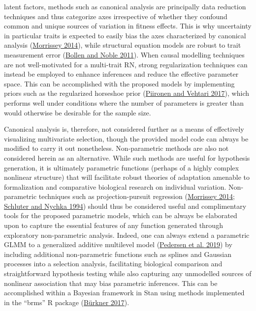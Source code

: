\documentclass{article}
\begin{document}
latent factors, methods such as canonical analysis are principally data
reduction techniques and thus categorize axes irrespective of whether
they confound common and unique sources of variation in fitness effects.
This is why uncertainty in particular traits is expected to easily bias
the axes characterized by canonical analysis
(\protect\hyperlink{ref-Morrissey2014}{Morrissey 2014}), while
structural equation models are robust to trait measurement error
(\protect\hyperlink{ref-Bollen2011}{Bollen and Noble 2011}). When causal
modelling techniques are not well-motivated for a multi-trait RN, strong
regularization techniques can instead be employed to enhance inferences
and reduce the effective parameter space. This can be accomplished with
the proposed models by implementing priors such as the regularized
horseshoe prior (\protect\hyperlink{ref-Piir2017}{Piironen and Vehtari
2017}), which performs well under conditions where the number of
parameters is greater than would otherwise be desirable for the sample
size.

Canonical analysis is, therefore, not considered further as a means of
effectively visualizing multivariate selection, though the provided
model code can always be modified to carry it out nonetheless.
Non-parametric methods are also not considered herein as an alternative.
While such methods are useful for hypothesis generation, it is
ultimately parametric functions (perhaps of a highly complex nonlinear
structure) that will facilitate robust theories of adaptation amenable
to formalization and comparative biological research on individual
variation. Non-parametric techniques such as projection-pursuit
regression (\protect\hyperlink{ref-Morrissey2014}{Morrissey 2014};
\protect\hyperlink{ref-Schluter1994}{Schluter and Nychka 1994}) should
thus be considered useful and complimentary tools for the proposed
parametric models, which can be always be elaborated upon to capture the
essential features of any function generated through exploratory
non-parametric analysis. Indeed, one can always extend a parametric GLMM
to a generalized additive multilevel model
(\protect\hyperlink{ref-Pedersen2019}{Pedersen et al. 2019}) by
including additional non-parametric functions such as splines and
Gaussian processes into a selection analysis, facilitating biological
comparison and straightforward hypothesis testing while also capturing
any unmodelled sources of nonlinear association that may bias parametric
inferences. This can be accomplished within a Bayesian framework in Stan
using methods implemented in the ``brms'' R package
(\protect\hyperlink{ref-brms2017}{Bürkner 2017}).
\end{document}
